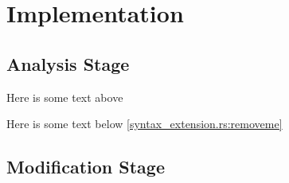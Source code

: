 \chapter{Implementation}
\section{Analysis Stage}

Here is some text above


Here is some text below \autoref{syntax_extension.rs:removeme}

\section{Modification Stage}
